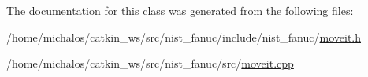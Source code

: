 The documentation for this class was generated from the following files\-:\begin{DoxyCompactItemize}
\item 
/home/michalos/catkin\-\_\-ws/src/nist\-\_\-fanuc/include/nist\-\_\-fanuc/\hyperlink{moveit_8h}{moveit.\-h}\item 
/home/michalos/catkin\-\_\-ws/src/nist\-\_\-fanuc/src/\hyperlink{moveit_8cpp}{moveit.\-cpp}\end{DoxyCompactItemize}
